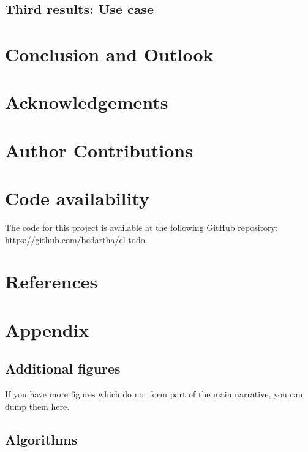 \subsection{Third results: Use case}
\lipsum[3]

\section{Conclusion and Outlook}
\lipsum[7][1-20]

\section{Acknowledgements}
\lipsum[8][1-5]

\section{Author Contributions}
\lipsum[1][1-9]

\section{Code availability}
The code for this project is available at the following GitHub repository:
\url{https://github.com/bedartha/cl-todo}.

\section{References}



\section{Appendix}

\subsection{Additional figures}
If you have more figures which do not form part of the main narrative, you can
dump them here.

\subsection{Algorithms}

